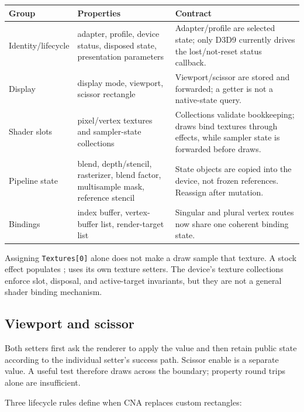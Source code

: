 \begin{center}
\small
\begin{tabular}{@{}p{}p{}p{}@{}}
\toprule
\textbf{Group} & \textbf{Properties} & \textbf{Contract} \\
\midrule
Identity/lifecycle & adapter, profile, device status, disposed state, presentation parameters & Adapter/profile are selected state; only D3D9 currently drives the lost/not-reset status callback. \\
Display & display mode, viewport, scissor rectangle & Viewport/scissor are stored and forwarded; a getter is not a native-state query. \\
Shader slots & pixel/vertex textures and sampler-state collections & Collections validate bookkeeping; draws bind textures through effects, while sampler state is forwarded before draws. \\
Pipeline state & blend, depth/stencil, rasterizer, blend factor, multisample mask, reference stencil & State objects are copied into the device, not frozen references. Reassign after mutation. \\
Bindings & index buffer, vertex-buffer list, render-target list & Singular and plural vertex routes now share one coherent binding state. \\
\bottomrule
\end{tabular}
\end{center}

Assigning \texttt{Textures[0]} alone does not make a draw sample that texture. A stock effect
populates ;  uses its own texture setters. The
device's texture collections enforce slot, disposal, and active-target invariants, but they are
not a general shader binding mechanism.

\subsection{Viewport and scissor}
\label{sec:graphicsdevice-viewport-scissor}

Both setters first ask the renderer to apply the value and then retain public state according to
the individual setter's success path. Scissor enable is a separate
 value. A useful test therefore draws across the
boundary; property round trips alone are insufficient.

Three lifecycle rules define when CNA replaces custom rectangles:

